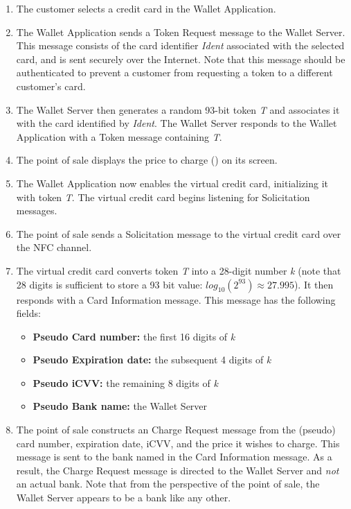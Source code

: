 \begin{enumerate}

\item The customer selects a credit card in the Wallet Application.

\item The Wallet Application sends a Token Request message to the Wallet Server.
    This message consists of the card identifier \emph{Ident} associated with the selected card, and is sent securely over the Internet.
    Note that this message should be authenticated to prevent a customer from requesting a token to a different customer's card.

\item The Wallet Server then generates a random 93-bit token \emph{T} and associates it with the card identified by \emph{Ident}.
    The Wallet Server responds to the Wallet Application with a Token message containing \emph{T}.

\item The point of sale displays the price to charge (\val{\$}) on its screen.

\item The Wallet Application now enables the virtual credit card, initializing it with token \emph{T}.
    The virtual credit card begins listening for Solicitation messages.

\item The point of sale sends a Solicitation message to the virtual credit card over the NFC channel.

\item The virtual credit card converts token \emph{T} into a 28-digit number \emph{k}
    (note that 28 digits is sufficient to store a 93 bit value: $log_{10}(2^{93}) \approx 27.995$).
    It then responds with a Card Information message.
    This message has the following fields:
    \begin{itemize}
    \item \textbf{Pseudo Card number:} the first 16 digits of \emph{k}
    \item \textbf{Pseudo Expiration date:} the subsequent 4 digits of \emph{k}
    \item \textbf{Pseudo iCVV:} the remaining 8 digits of \emph{k}
    \item \textbf{Pseudo Bank name:} the Wallet Server
   	\end{itemize}

\item The point of sale constructs an Charge Request message from the (pseudo) card number, expiration date, iCVV, and the price it wishes to charge.
    This message is sent to the bank named in the Card Information message.
    As a result, the Charge Request message is directed to the Wallet Server and \emph{not} an actual bank.
    Note that from the perspective of the point of sale, the Wallet Server appears to be a bank like any other.


\end{enumerate}
